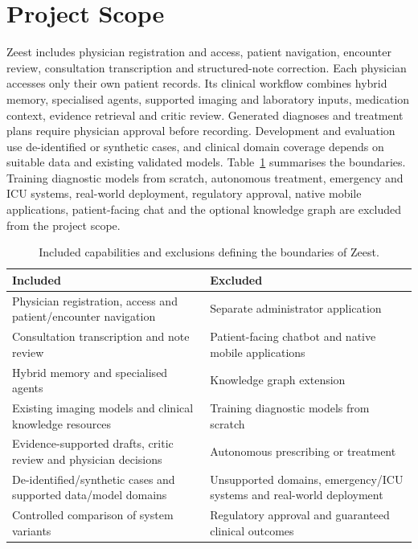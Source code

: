 \clearpage
\section{Project Scope}

Zeest includes physician registration and access, patient navigation, encounter review, consultation transcription and structured-note correction. Each physician accesses only their own patient records. Its clinical workflow combines hybrid memory, specialised agents, supported imaging and laboratory inputs, medication context, evidence retrieval and critic review. Generated diagnoses and treatment plans require physician approval before recording. Development and evaluation use de-identified or synthetic cases, and clinical domain coverage depends on suitable data and existing validated models. Table~\ref{tab:kashaf:scope} summarises the boundaries. Training diagnostic models from scratch, autonomous treatment, emergency and ICU systems, real-world deployment, regulatory approval, native mobile applications, patient-facing chat and the optional knowledge graph are excluded from the project scope.

\begin{table}[htbp]
\centering
\small
\caption{Included capabilities and exclusions defining the boundaries of Zeest.}
\label{tab:kashaf:scope}
\begin{tabular}{|p{}|p{}|}
\hline
Included & Excluded \\ \hline
Physician registration, access and patient/encounter navigation & Separate administrator application \\ \hline
Consultation transcription and note review & Patient-facing chatbot and native mobile applications \\ \hline
Hybrid memory and specialised agents & Knowledge graph extension \\ \hline
Existing imaging models and clinical knowledge resources & Training diagnostic models from scratch \\ \hline
Evidence-supported drafts, critic review and physician decisions & Autonomous prescribing or treatment \\ \hline
De-identified/synthetic cases and supported data/model domains & Unsupported domains, emergency/ICU systems and real-world deployment \\ \hline
Controlled comparison of system variants & Regulatory approval and guaranteed clinical outcomes \\ \hline
\end{tabular}
\end{table}

